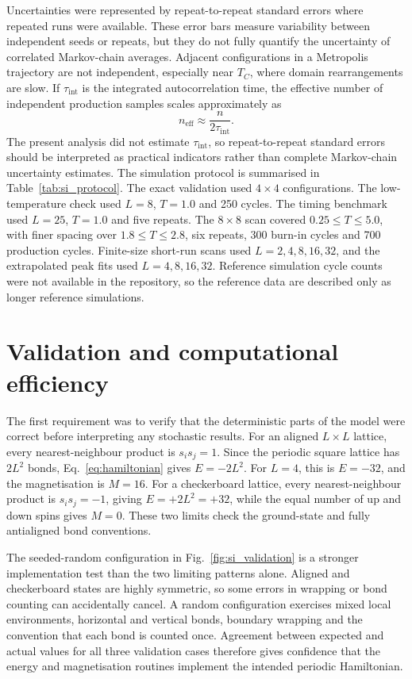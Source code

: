 \documentclass[twoside,twocolumn,9pt]{extarticle}
\begin{document}
Uncertainties were represented by repeat-to-repeat standard errors where repeated runs were available. These error bars measure variability between independent seeds or repeats, but they do not fully quantify the uncertainty of correlated Markov-chain averages. Adjacent configurations in a Metropolis trajectory are not independent, especially near \(T_C\), where domain rearrangements are slow. If \(\tau_{\mathrm{int}}\) is the integrated autocorrelation time, the effective number of independent production samples scales approximately as
\begin{equation}
  n_{\mathrm{eff}}\approx \frac{n}{2\tau_{\mathrm{int}}}.
  \label{eq:neff}
\end{equation}
The present analysis did not estimate \(\tau_{\mathrm{int}}\), so repeat-to-repeat standard errors should be interpreted as practical indicators rather than complete Markov-chain uncertainty estimates.\cite{sokal1989,landau2021} The simulation protocol is summarised in Table~\ref{tab:si_protocol}. The exact validation used \(4 \times 4\) configurations. The low-temperature check used \(L=8\), \(T=1.0\) and 250 cycles. The timing benchmark used \(L=25\), \(T=1.0\) and five repeats. The \(8 \times 8\) scan covered \(0.25\leq T\leq5.0\), with finer spacing over \(1.8\leq T\leq2.8\), six repeats, 300 burn-in cycles and 700 production cycles. Finite-size short-run scans used \(L=2,4,8,16,32\), and the extrapolated peak fits used \(L=4,8,16,32\). Reference simulation cycle counts were not available in the repository, so the reference data are described only as longer reference simulations.

\section{Validation and computational efficiency}

The first requirement was to verify that the deterministic parts of the model were correct before interpreting any stochastic results. For an aligned \(L\times L\) lattice, every nearest-neighbour product is \(s_i s_j=1\). Since the periodic square lattice has \(2L^2\) bonds, Eq.~\eqref{eq:hamiltonian} gives \(E=-2L^2\). For \(L=4\), this is \(E=-32\), and the magnetisation is \(M=16\). For a checkerboard lattice, every nearest-neighbour product is \(s_i s_j=-1\), giving \(E=+2L^2=+32\), while the equal number of up and down spins gives \(M=0\). These two limits check the ground-state and fully antialigned bond conventions.

The seeded-random configuration in Fig.~\ref{fig:si_validation} is a stronger implementation test than the two limiting patterns alone. Aligned and checkerboard states are highly symmetric, so some errors in wrapping or bond counting can accidentally cancel. A random configuration exercises mixed local environments, horizontal and vertical bonds, boundary wrapping and the convention that each bond is counted once. Agreement between expected and actual values for all three validation cases therefore gives confidence that the energy and magnetisation routines implement the intended periodic Hamiltonian.
\end{document}
